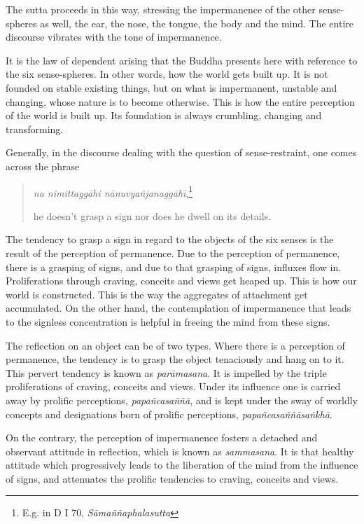 The sutta proceeds in this way, stressing the impermanence of the other sense-spheres as well, the ear, the nose, the tongue, the body and the mind. The entire discourse vibrates with the tone of impermanence.

It is the law of dependent arising that the Buddha presents here with reference to the six sense-spheres. In other words, how the world gets built up. It is not founded on stable existing things, but on what is impermanent, unstable and changing, whose nature is to become otherwise. This is how the entire perception of the world is built up. Its foundation is always crumbling, changing and transforming.

Generally, in the discourse dealing with the question of sense-restraint, one comes across the phrase

\begin{quote}
\emph{na nimittaggāhi nānuvyañjanaggāhī},\footnote{E.g. in D I 70, \emph{Sāmaññaphalasutta}}

he doesn't grasp a sign nor does he dwell on its details.
\end{quote}

The tendency to grasp a sign in regard to the objects of the six senses is the result of the perception of permanence. Due to the perception of permanence, there is a grasping of signs, and due to that grasping of signs, influxes flow in. Proliferations through craving, conceits and views get heaped up. This is how our world is constructed. This is the way the aggregates of attachment get accumulated. On the other hand, the contemplation of impermanence that leads to the signless concentration is helpful in freeing the mind from these signs.

The reflection on an object can be of two types. Where there is a perception of permanence, the tendency is to grasp the object tenaciously and hang on to it. This pervert tendency is known as \emph{parāmasana}. It is impelled by the triple proliferations of craving, conceits and views. Under its influence one is carried away by prolific perceptions, \emph{papañcasaññā}, and is kept under the sway of worldly concepts and designations born of prolific perceptions, \emph{papañcasaññāsaṅkhā}.

On the contrary, the perception of impermanence fosters a detached and observant attitude in reflection, which is known as \emph{sammasana}. It is that healthy attitude which progressively leads to the liberation of the mind from the influence of signs, and attenuates the prolific tendencies to craving, conceits and views.

